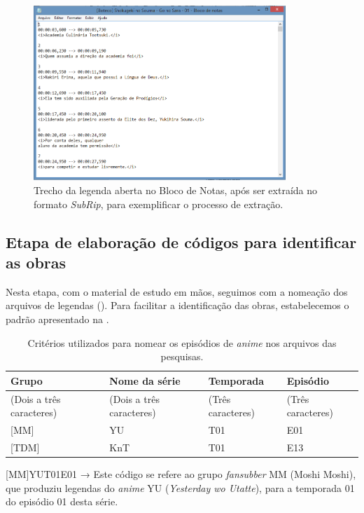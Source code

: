 \documentclass[portuguese]{textolivre}
\begin{document}
\begin{figure}[htbp]
 \centering
 \includegraphics[width=0.85\textwidth]{Fig8.png}
 \caption{Trecho da legenda aberta no Bloco de Notas, após ser extraída no formato \textit{SubRip}, para exemplificar o processo de extração.}
 \label{fig08}
\end{figure}

\subsection{Etapa de elaboração de códigos para identificar as obras}\label{sec-organizacao-latex}
Nesta etapa, com o material de estudo em mãos, seguimos com a nomeação dos arquivos de legendas (). Para facilitar a identificação das obras, estabelecemos o padrão apresentado na .

\begin{table}[h!]
\caption{Critérios utilizados para nomear os episódios de \textit{anime} nos arquivos das pesquisas.}
\label{tbl3}
\centering
\begin{tabularx}{\linewidth}{XXXX}
\toprule
\textbf{Grupo} & \textbf{Nome da série} & \textbf{Temporada} & \textbf{Episódio} \\ 
\midrule
(Dois a três caracteres) & (Dois a três caracteres) & (Três caracteres) & (Três caracteres)
\\ 
{[}MM{]} & YU & T01 & E01
\\
{[}TDM{]} & KnT & T01 & E13
\\
\bottomrule
\end{tabularx}
\end{table}

[MM]YUT01E01 → Este código se refere ao grupo \textit{fansubber} MM (Moshi Moshi), que produziu legendas do \textit{anime} YU (\textit{Yesterday wo Utatte}), para a temporada 01 do episódio 01 desta série.
\end{document}
